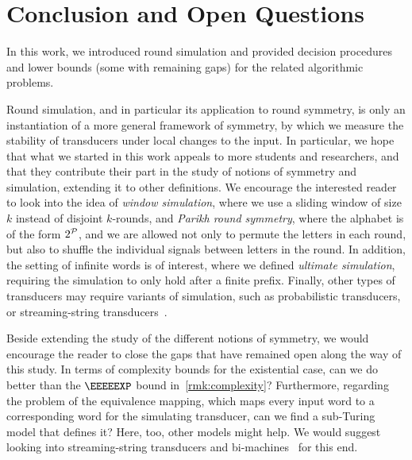 \chapter{Conclusion and Open Questions}
\label{chap:conclusion}
\label{chap:discussion}
\label{chap:future}

In this work, we introduced round simulation and provided decision procedures and lower bounds (some with remaining gaps) for the related algorithmic problems.

Round simulation, and in particular its application to round symmetry, is only an instantiation of a more general framework of symmetry, by which we measure the stability of transducers under local changes to the input. In particular, we hope that what we started in this work appeals to more students and researchers, and that they contribute their part in the study of notions of symmetry and simulation, extending it to other definitions. We encourage the interested reader to look into the idea of \emph{window simulation}, where we use a sliding window of size $k$ instead of disjoint $k$-rounds, and \emph{Parikh round symmetry}, where the alphabet is of the form $2^{\mathcal{P}}$, and we are allowed not only to permute the letters in each round, but also to shuffle the individual signals between letters in the round. 
In addition, the setting of infinite words is of interest, where we defined \emph{ultimate simulation}, requiring the simulation to only hold after a finite prefix.
Finally, other types of transducers may require variants of simulation, such as probabilistic transducers, or streaming-string transducers~\cite{Alur2010}.

Beside extending the study of the different notions of symmetry, we would encourage the reader to close the gaps that have remained open along the way of this study. In terms of complexity bounds for the existential case, can we do better than the $\EEEEEXP$ bound in~\cref{rmk:complexity}?
Furthermore, regarding the problem of the equivalence mapping, which maps every input word to a corresponding word for the simulating transducer, can we find a sub-Turing model that defines it? Here, too, other models might help. We would suggest looking into streaming-string transducers and bi-machines~\cite{Muscholl} for this end.
